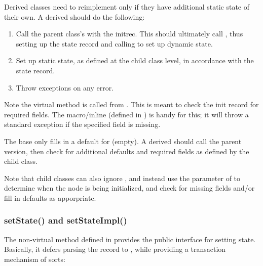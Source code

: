 \documentclass[10pt]{article}
\begin{document}
  Derived classes need to reimplement  only if they have additional
  static state of their own. A derived  should do the following:

  \begin{enumerate}
  
  \item Call the parent class's  with the initrec. This should
    ultimately call , thus setting up the state record  and
    calling  to set up dynamic state.

  \item Set up static state, as defined at the child class level, in accordance
    with the state record.

  \item Throw exceptions on any error. 

  \end{enumerate}
  
  Note the virtual  method is called from
  . This is meant to check the init record for required
  fields. The  macro/inline (defined in
  ) is handy for this; it will throw a standard exception if the
  specified field is missing. 
  
  The base  only fills in a default for 
  (empty). A derived  should call the parent version, then
  check for additional defaults and required fields as defined by the child
  class.
  
  Note that child classes can also ignore , and instead use
  the  parameter of  to determine when
  the node is being initialized, and check for missing fields and/or fill in
  defaults as apporpriate.

\subsubsection{setState() and setStateImpl()}

  The non-virtual  method defined in  provides the
  public interface for setting state. Basically, it defers parsing the record
  to , while providing a transaction mechanism of sorts:
\end{document}
